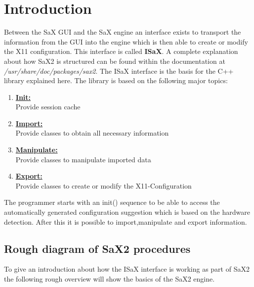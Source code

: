 \chapter{Introduction}
\minitoc

Between the SaX GUI and the SaX engine an interface exists to
transport the information from the GUI into the engine which
is then able to create or modify the X11 configuration. This
interface is called \textbf{ISaX}. A complete explanation about
how SaX2 is structured can be found within the documentation
at \textit{/usr/share/doc/packages/sax2}. 
The ISaX interface is the basis for the C++ library explained here.
The library is based on the following major topics:

\begin{enumerate}
\item \textbf{\underline{Init:}}\\
      Provide session cache
\item \textbf{\underline{Import:}}\\
      Provide classes to obtain all necessary information
\item \textbf{\underline{Manipulate:}}\\
      Provide classes to manipulate imported data
\item \textbf{\underline{Export:}}\\
      Provide classes to create or modify the X11-Configuration
\end{enumerate}

The programmer starts with an init() sequence to be able to
access the automatically generated configuration suggestion which is
based on the hardware detection. After this it is possible to
import,manipulate and export information.

\section{Rough diagram of SaX2 procedures}
To give an introduction about how the ISaX interface is working
as part of SaX2 the following rough overview will show the basics
of the SaX2 engine.

\newpage

